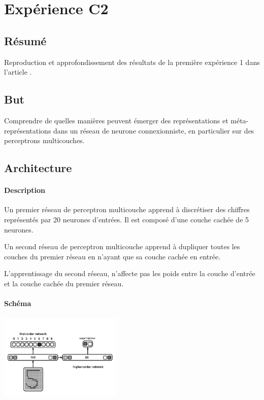 \section{Expérience C2} 
  \subsection{Résumé}
    Reproduction et approfondissement des résultats de la première expérience 1 dans l'article 
    \cite{Cleeremans_2007}. 

  
  \subsection{But}
    Comprendre de quelles manières peuvent émerger des représentations et méta-représentations dans 
    un réseau de neurone connexionniste, en particulier sur des perceptrons multicouches.
  
  
  \subsection{Architecture}
    \paragraph{Description}
      Un premier réseau de perceptron multicouche apprend à discrétiser des chiffres représentés
      par 20 neurones d'entrées. Il est composé d'une couche cachée de 5 neurones.
      
      Un second réseau de perceptron multicouche apprend à dupliquer toutes les couches du premier
      réseau en n'ayant que sa couche cachée en entrée.
      
      L'apprentissage du second réseau, n'affecte pas les poids entre la couche d'entrée et la 
      couche cachée du premier réseau.

    \paragraph{Schéma}
      \begin{center}
	\includegraphics[width=220px]{data/expC2/schema.png}
      \end{center}
      
